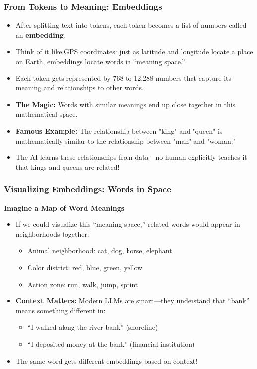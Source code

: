 \documentclass{beamer}
\begin{document}
\begin{frame}
    \frametitle{From Tokens to Meaning: Embeddings}
    \begin{itemize}
        \item After splitting text into tokens, each token becomes a list of numbers called an \textbf{embedding}.
        \item Think of it like GPS coordinates: just as latitude and longitude locate a place on Earth, embeddings locate words in ``meaning space.''
        \item Each token gets represented by 768 to 12,288 numbers that capture its meaning and relationships to other words.
        \item \textbf{The Magic:} Words with similar meanings end up close together in this mathematical space.
        \item \textbf{Famous Example:} The relationship between "king" and "queen" is mathematically similar to the relationship between "man" and "woman."
        \item The AI learns these relationships from data—no human explicitly teaches it that kings and queens are related!
    \end{itemize}
\end{frame}
\begin{frame}
    \frametitle{Visualizing Embeddings: Words in Space}
    \begin{center}
        \textbf{Imagine a Map of Word Meanings}
    \end{center}
    \begin{itemize}
        \item If we could visualize this ``meaning space,'' related words would appear in neighborhoods together:
        \begin{itemize}
            \item Animal neighborhood: cat, dog, horse, elephant
            \item Color district: red, blue, green, yellow
            \item Action zone: run, walk, jump, sprint
        \end{itemize}
    \item \textbf{Context Matters:} Modern LLMs are smart---they understand that ``bank'' means something different in:
        \begin{itemize}
            \item ``I walked along the river bank'' (shoreline)
            \item ``I deposited money at the bank'' (financial institution)
        \end{itemize}
    \item The same word gets different embeddings based on context!
    \end{itemize}
\end{frame}
\end{document}
